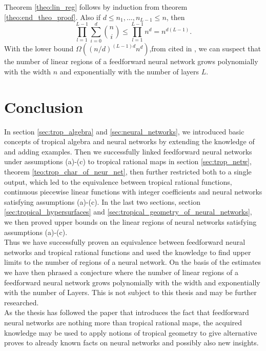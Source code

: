 \documentclass{article}
\theoremstyle{definition}
\begin{document}
Theorem \ref{theo:lin_reg} follows by induction from theorem \ref{theo:end_theo_proof}. Also if $d \leq n_1, \dots , n_{L-1} \leq n$, then
$$\displaystyle\prod_{l=1}^{L-1}\displaystyle\sum_{i=0}^{d}\binom{n}{i} \leq \displaystyle\prod_{l=1}^{L-1} n^{d} = n^{d(L-1)}.$$ With the lower bound $\Omega((n/d)^{(L-1)d}n^{d})$,from \cite[corollary 5]{montufar2014number} cited in \cite{maclagan2015introduction}, we can suspect that the number of linear regions of a feedforward neural network grows polynomially with the width $n$ and exponentially with the number of layers $L$.

\newpage

\section{Conclusion}
\label{sec:conclusion}

In section \ref{sec:trop_algebra} and \ref{sec:neural_networks}, we introduced basic concepts of tropical algebra and neural networks by extending the knowledge of \cite{zhang2018tropical} and adding examples.
Then we successfully linked feedforward neural networks under assumptions (a)-(c) to tropical rational maps in section \ref{sec:trop_netw}, theorem \ref{teo:trop_char_of_neur_net}, then further restricted both to a single output, which led to the equivalence between tropical rational functions, continuous piecewise linear functions with integer coefficients and neural networks satisfying assumptions (a)-(c).
In the last two sections, section \ref{sec:tropical_hypersurfaces} and \ref{sec:tropical_geometry_of_neural_networks}, we then proved  upper bounds on the linear regions of neural networks satisfying assumptions (a)-(c). \\
Thus we have successfully proven an equivalence between feedforward neural networks and tropical rational functions and used the knowledge to find upper limits to the number of regions of a neural network. On the basis of the estimates we have then phrased a conjecture where the number of linear regions of a feedforward neural network grows polynomially with the width and exponentially with the number of Layers. This is not subject to this thesis and may be further researched. \\
As the thesis has followed the paper \cite{zhang2018tropical} that introduces the fact that feedforward neural networks are nothing more than tropical rational maps, the acquired knowledge may be used to apply notions of tropical geometry to give alternative proves to already known facts on neural networks and possibly also new insights.
\end{document}
